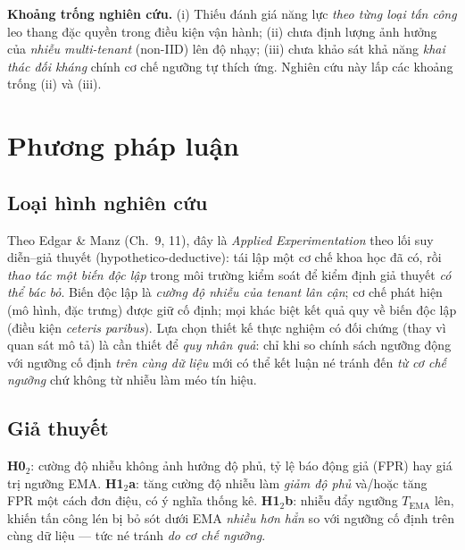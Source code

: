 \documentclass[conference,10pt]{IEEEtran}
\begin{document}
\textbf{Khoảng trống nghiên cứu.} (i) Thiếu đánh giá năng lực \textit{theo từng loại tấn công} leo thang đặc quyền trong điều kiện vận hành; (ii) chưa định lượng ảnh hưởng của \textit{nhiễu multi-tenant} (non-IID) lên độ nhạy; (iii) chưa khảo sát khả năng \textit{khai thác đối kháng} chính cơ chế ngưỡng tự thích ứng. Nghiên cứu này lấp các khoảng trống (ii) và (iii).

\section{Phương pháp luận}\label{sec:method}

\subsection{Loại hình nghiên cứu}
Theo Edgar \& Manz \cite{edgarmanz2017} (Ch.~9, 11), đây là \textit{Applied Experimentation} theo lối suy diễn--giả thuyết (hypothetico-deductive): tái lập một cơ chế khoa học đã có, rồi \textit{thao tác một biến độc lập} trong môi trường kiểm soát để kiểm định giả thuyết \textit{có thể bác bỏ}. Biến độc lập là \textit{cường độ nhiễu của tenant lân cận}; cơ chế phát hiện (mô hình, đặc trưng) được giữ cố định; mọi khác biệt kết quả quy về biến độc lập (điều kiện \textit{ceteris paribus}). Lựa chọn thiết kế thực nghiệm có đối chứng (thay vì quan sát mô tả) là cần thiết để \textit{quy nhân quả}: chỉ khi so chính sách ngưỡng động với ngưỡng cố định \textit{trên cùng dữ liệu} mới có thể kết luận né tránh đến \textit{từ cơ chế ngưỡng} chứ không từ nhiễu làm méo tín hiệu.

\subsection{Giả thuyết}
\textbf{H0$_2$}: cường độ nhiễu không ảnh hưởng độ phủ, tỷ lệ báo động giả (FPR) hay giá trị ngưỡng EMA.
\textbf{H1$_2$a}: tăng cường độ nhiễu làm \textit{giảm độ phủ} và/hoặc tăng FPR một cách đơn điệu, có ý nghĩa thống kê.
\textbf{H1$_2$b}: nhiễu đẩy ngưỡng $T_{\text{EMA}}$ lên, khiến tấn công lén bị bỏ sót dưới EMA \textit{nhiều hơn hẳn} so với ngưỡng cố định trên cùng dữ liệu — tức né tránh \textit{do cơ chế ngưỡng}.
\end{document}
